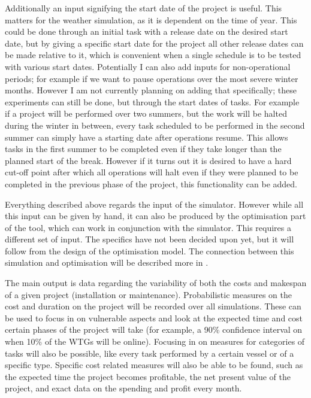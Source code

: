 \documentclass[a4paper,12pt]{article}
\begin{document}
Additionally an input signifying the start date of the project is useful. This matters for the weather simulation, as it is dependent on the time of year. This could be done through an initial task with a release date on the desired start date, but by giving a specific start date for the project all other release dates can be made relative to it, which is convenient when a single schedule is to be tested with various start dates. Potentially I can also add inputs for non-operational periods; for example if we want to pause operations over the most severe winter months. However I am not currently planning on adding that specifically; these experiments can still be done, but through the start dates of tasks. For example if a project will be performed over two summers, but the work will be halted during the winter in between, every task scheduled to be performed in the second summer can simply have a starting date after operations resume. This allows tasks in the first summer to be completed even if they take longer than the planned start of the break. However if it turns out it is desired to have a hard cut-off point after which all operations will halt even if they were planned to be completed in the previous phase of the project, this functionality can be added. 

Everything described above regards the input of the simulator. However while all this input can be given by hand, it can also be produced by the optimisation part of the tool, which can work in conjunction with the simulator. This requires a different set of input. The specifics have not been decided upon yet, but it will follow from the design of the optimisation model. The connection between this simulation and optimisation will be described more in .

\bigskip

The main output is data regarding the variability of both the costs and makespan of a given project (installation or maintenance). Probabilistic measures on the cost and duration on the project will be recorded over all simulations. These can be used to focus in on vulnerable aspects and look at the expected time and cost certain phases of the project will take (for example, a 90\% confidence interval on when 10\% of the WTGs will be online). Focusing in on measures for categories of tasks will also be possible, like every task performed by a certain vessel or of a specific type. Specific cost related measures will also be able to be found, such as the expected time the project becomes profitable, the net present value of the project, and exact data on the spending and profit every month. 
\end{document}
